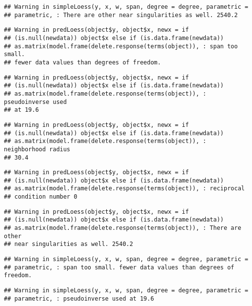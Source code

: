 \documentclass[]{article}
\begin{document}
\begin{verbatim}
## Warning in simpleLoess(y, x, w, span, degree = degree, parametric =
## parametric, : There are other near singularities as well. 2540.2
\end{verbatim}

\begin{verbatim}
## Warning in predLoess(object$y, object$x, newx = if
## (is.null(newdata)) object$x else if (is.data.frame(newdata))
## as.matrix(model.frame(delete.response(terms(object)), : span too small.
## fewer data values than degrees of freedom.
\end{verbatim}

\begin{verbatim}
## Warning in predLoess(object$y, object$x, newx = if
## (is.null(newdata)) object$x else if (is.data.frame(newdata))
## as.matrix(model.frame(delete.response(terms(object)), : pseudoinverse used
## at 19.6
\end{verbatim}

\begin{verbatim}
## Warning in predLoess(object$y, object$x, newx = if
## (is.null(newdata)) object$x else if (is.data.frame(newdata))
## as.matrix(model.frame(delete.response(terms(object)), : neighborhood radius
## 30.4
\end{verbatim}

\begin{verbatim}
## Warning in predLoess(object$y, object$x, newx = if
## (is.null(newdata)) object$x else if (is.data.frame(newdata))
## as.matrix(model.frame(delete.response(terms(object)), : reciprocal
## condition number 0
\end{verbatim}

\begin{verbatim}
## Warning in predLoess(object$y, object$x, newx = if
## (is.null(newdata)) object$x else if (is.data.frame(newdata))
## as.matrix(model.frame(delete.response(terms(object)), : There are other
## near singularities as well. 2540.2
\end{verbatim}

\begin{verbatim}
## Warning in simpleLoess(y, x, w, span, degree = degree, parametric =
## parametric, : span too small. fewer data values than degrees of freedom.
\end{verbatim}

\begin{verbatim}
## Warning in simpleLoess(y, x, w, span, degree = degree, parametric =
## parametric, : pseudoinverse used at 19.6
\end{verbatim}
\end{document}

